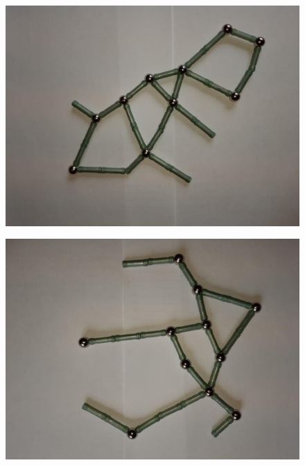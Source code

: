 \documentclass[10pt]{article}
\begin{document}
	\begin{figure}[h]
		\begin{minipage}[h]{0.45\linewidth}
			\begin{center}
				{\includegraphics[width=1.0\linewidth]{data/2.pdf}}
			\end{center}
		\end{minipage}
		\hfill
		\begin{minipage}[h]{0.45\linewidth}
			\begin{center}
				{\includegraphics[width=1.0\linewidth]{data/3.pdf}}
			\end{center}
		\end{minipage}
		\vfill
		\begin{minipage}[h]{0.45\linewidth}

\end{minipage}
\end{figure}
\end{document}

